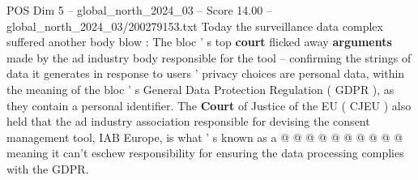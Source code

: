 \begin{textsample}{POS Dim 5 – global\_north\_2024\_03 – Score 14.00 – global\_north\_2024\_03/200279153.txt}
Today the surveillance data complex suffered another body blow : The bloc ' s top \textbf{court} flicked away \textbf{arguments} made by the ad industry body responsible for the tool -- confirming the strings of data it generates in response to users ' privacy choices are personal data, within the meaning of the bloc ' s General Data Protection Regulation ( GDPR ), as they contain a personal identifier.
The \textbf{Court} of Justice of the EU ( CJEU ) also held that the ad industry association responsible for devising the consent management tool, IAB Europe, is what ' s known as a @ @ @ @ @ @ @ @ @ @ meaning it can't eschew responsibility for ensuring the data processing complies with the GDPR.

\end{textsample}
